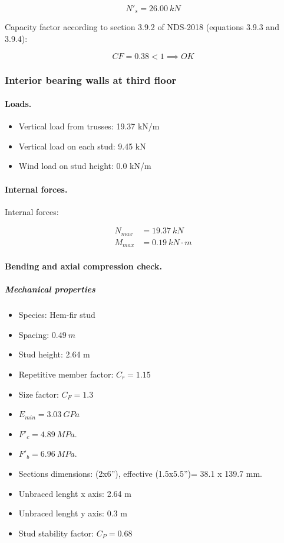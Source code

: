 \begin{equation}
  N'_s= 26.00\ kN
\end{equation}

\noindent Capacity factor according to section 3.9.2 of NDS-2018 (equations 3.9.3 and 3.9.4):

\begin{equation}
  CF= 0.38 < 1 \implies OK
\end{equation}

\subsubsection{Interior bearing walls at third floor}

\paragraph{Loads.}

\begin{itemize}
\item Vertical load from trusses: 19.37 kN/m
\item Vertical load on each stud: 9.45 kN
\item Wind load on stud height: 0.0 kN/m
\end{itemize}

\paragraph{Internal forces.}

\noindent Internal forces:

\begin{align}
  N_{max}&= 19.37\ kN \\
  M_{max}&= 0.19\ kN \cdot m
\end{align}

\paragraph{Bending and axial compression check.}

\subparagraph{Mechanical properties}

\begin{itemize}
\item Species: Hem-fir stud
\item Spacing: $0.49\ m$
\item Stud height: 2.64 m
\item Repetitive member factor: $C_r= 1.15$
\item Size factor: $C_F= 1.3$
\item $E_{min}= 3.03\ GPa$
\item $F'_c= 4.89\ MPa$.
\item $F'_b= 6.96\ MPa$.
\item Sections dimensions: (2x6''), effective (1.5x5.5'')= 38.1 x 139.7  mm.
\item Unbraced lenght x axis: 2.64 m
\item Unbraced lenght y axis: 0.3 m
\item Stud stability factor: $C_P= 0.68$
\end{itemize}

